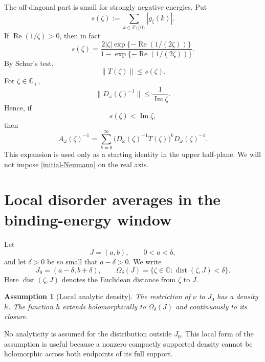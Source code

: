 \documentclass[12pt,a4paper]{article}
\numberwithin{equation}{section}
\newcommand{\dist}{\operatorname{dist}}
\newcommand{\C}{\mathbb C}
\newcommand{\Z}{\mathbb Z}
\newcommand{\Om}{\Omega}
\renewcommand{\Re}{\operatorname{Re}}
\renewcommand{\Im}{\operatorname{Im}}
\newtheorem{ass}[thm]{Assumption}
\begin{document}
The off-diagonal part is small for strongly negative energies.  Put
\begin{equation}
s(\zeta):=\sum_{k\in\Z\setminus\{0\}}|g_\zeta(k)|.
\label{s-zeta}
\end{equation}
If $\Re(1/\zeta)>0$, then in fact
\begin{equation}
s(\zeta)
=
\frac{2|\zeta|\exp\{-\Re(1/(2\zeta))\}}
 {1-\exp\{-\Re(1/(2\zeta))\}}.
\label{s-bound}
\end{equation}
By Schur's test,
\begin{equation}
\|T(\zeta)\|\le s(\zeta).
\label{T-bound}
\end{equation}
For $\zeta\in\C_+$,
$$
\|D_\omega(\zeta)^{-1}\|\le\frac{1}{\Im\zeta}.
$$
Hence, if
\begin{equation}
s(\zeta)<\Im\zeta,
\label{initial-Neumann}
\end{equation}
then
\begin{equation}
A_\omega(\zeta)^{-1}
 =\sum_{k=0}^\infty
 \bigl(D_\omega(\zeta)^{-1}T(\zeta)\bigr)^k
 D_\omega(\zeta)^{-1}.
\label{Neumann}
\end{equation}
This expansion is used only as a starting identity in the upper half-plane.
We will not impose \eqref{initial-Neumann} on the real axis.

\section{Local disorder averages in the binding-energy window}\label{sec:single-site}

Let
$$
J=(a,b),\qquad 0<a<b,
$$
and let $\delta>0$ be so small that $a-\delta>0$.  We write
$$
J_0=(a-\delta,b+\delta),
\qquad
\Om_\delta(J)=\{\zeta\in\C:\dist(\zeta,J)<\delta\}.
$$
Here $\dist(\zeta,J)$ denotes the Euclidean distance from $\zeta$ to $J$.

\begin{ass}[Local analytic density]\label{ass:density}
The restriction of $\nu$ to $J_0$ has a density $h$.  The function $h$
extends holomorphically to $\Om_\delta(J)$ and continuously to its closure.
\end{ass}

No analyticity is assumed for the distribution outside $J_0$.  This local
form of the assumption is useful because a nonzero compactly supported
density cannot be holomorphic across both endpoints of its full support.
\end{document}
